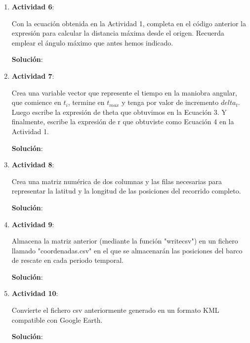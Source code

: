 \documentclass[11pt,letterpaper]{article}
\begin{document}
\begin{enumerate}
	\item \textbf{Actividad 6}:
	
	Con la ecuación obtenida en la Actividad 1, completa en el código anterior la expresión para calcular la distancia máxima desde el origen. Recuerda emplear el ángulo 
	máximo que antes hemos indicado.

	\textbf{Solución}: 

	
	\item \textbf{Actividad 7}:
	
	Crea una variable vector que represente el tiempo en la maniobra angular, que comience en $t_{i}$, termine en $t_{max}$ y tenga por valor de incremento $delta_{t}$.
	Luego escribe la expresión de theta que obtuvimos en la Ecuación 3. Y finalmente, escribe la expresión de r que obtuviste como Ecuación 4 en la Actividad 1.

	\textbf{Solución}: 

	
	\item \textbf{Actividad 8}:
	
	Crea una matriz numérica de dos columnas y las filas necesarias para representar la latitud y la longitud de las posiciones del recorrido completo.

	\textbf{Solución}: 

	
	\item \textbf{Actividad 9}:
	
	Almacena la matriz anterior (mediante la función "writecsv") en un fichero llamado "coordenadas.csv" en el que se almacenarán las posiciones del barco de rescate
	en cada periodo temporal.

	\textbf{Solución}: 

	
	\item \textbf{Actividad 10}:
	
	Convierte el fichero csv anteriormente generado en un formato KML compatible con Google Earth.

	\textbf{Solución}: 


\end{enumerate}
\end{document}
